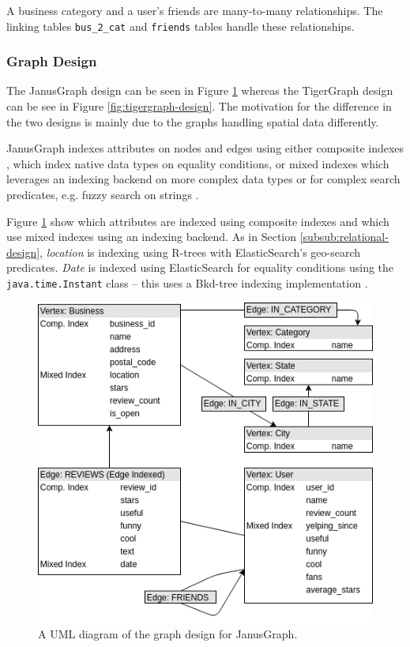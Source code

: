 A business category and a user's friends are many-to-many relationships. The linking tables \texttt{bus\_2\_cat} and \texttt{friends} tables handle these relationships. 

\subsubsection{Graph Design}

The JanusGraph design can be seen in Figure \ref{fig:janusgraph-design} whereas the TigerGraph design can be see in Figure \ref{fig:tigergraph-design}. The motivation for the difference in the two designs is mainly due to the graphs handling spatial data differently. 

JanusGraph indexes attributes on nodes and edges using either composite indexes \cite{janusgraph-comp-index}, which index native data types on equality conditions, or mixed indexes which leverages an indexing backend on more complex data types or for complex search predicates, e.g. fuzzy search on strings \cite{janusgraph-mixed-index}. 

Figure \ref{fig:janusgraph-design} show which attributes are indexed using composite indexes and which use mixed indexes using an indexing backend. As in Section \ref{subsub:relational-design}, \emph{location} is indexing using R-trees with ElasticSearch's geo-search predicates. \emph{Date} is indexed using ElasticSearch for equality conditions using the \texttt{java.time.Instant} class -- this uses a Bkd-tree indexing implementation \cite{es-bkdtree-index}.

\begin{figure}[h!]
    \centering
    \includegraphics[width=12cm]{img/janus-design.png}
    \caption{A UML diagram of the graph design for JanusGraph.}
    \label{fig:janusgraph-design}
\end{figure}

